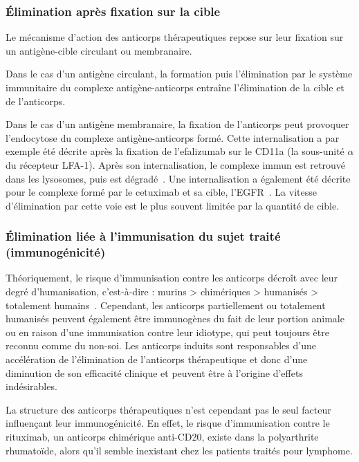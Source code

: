 \subsubsection{Élimination après fixation sur la cible}
Le mécanisme d'action des anticorps thérapeutiques repose sur leur fixation sur un antigène-cible circulant ou membranaire. 

Dans le cas d'un antigène circulant, la formation puis l'élimination par le système immunitaire du complexe antigène-anticorps entraîne l'élimination de la cible et de l'anticorps. 

Dans le cas d'un antigène membranaire, la fixation de l'anticorps peut provoquer l'endocytose du complexe antigène-anticorps formé. Cette internalisation a par exemple été décrite après la fixation de l'efalizumab sur le CD11a (la sous-unité $\alpha$ du récepteur LFA-1). Après son internalisation, le complexe immun est retrouvé dans les lysosomes, puis est dégradé~\citep{REF42}. Une internalisation a également été décrite pour le complexe formé par le cetuximab et sa cible, l'EGFR~\citep{REF43}. La vitesse d'élimination par cette voie est le plus souvent limitée par la quantité de cible.

\subsubsection{Élimination liée à l'immunisation du sujet traité (immunogénicité)}
Théoriquement, le risque d'immunisation contre les anticorps décroît avec leur degré d'humanisation, c'est-à-dire : murins > chimériques > humanisés > totalement humains~\citep{REF44}. Cependant, les anticorps partiellement ou totalement humanisés peuvent également être immunogènes du fait de leur portion animale ou en raison d'une immunisation contre leur idiotype, qui peut toujours être reconnu comme du non-soi. Les anticorps induits sont responsables d'une accélération de l'élimination de l'anticorps thérapeutique et donc d'une diminution de son efficacité clinique et peuvent être à l'origine d'effets indésirables.

La structure des anticorps thérapeutiques n'est cependant pas le seul facteur influençant leur immunogénicité. En effet, le risque d'immunisation contre le rituximab, un anticorps chimérique anti-CD20, existe dans la polyarthrite rhumatoïde, alors qu'il semble inexistant chez les patients traités pour lymphome.
